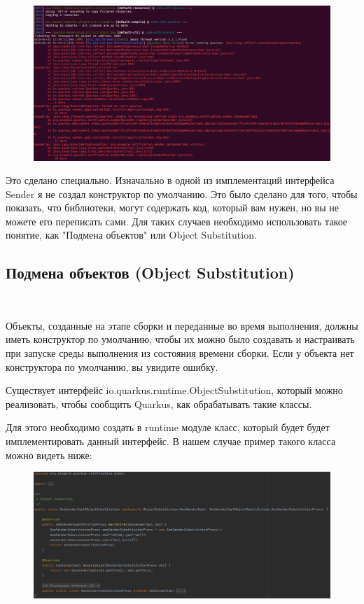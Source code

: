 \documentclass[russian,11pt]{article}
\begin{document}
\begin{figure}[H]
	\centering
	\includegraphics[width=\textwidth]{21}
\end{figure}

Это сделано специально. Изначально в одной из имплементаций интерфейса Sender я не создал конструктор по умолчанию. Это было сделано для того, чтобы показать, что библиотеки, могут содержать код, который вам нужен, но вы не можете его переписать сами. Для таких случаев необходимо использовать такое понятие, как "Подмена объектов" или Object Substitution.

\subsection{Подмена объектов (Object Substitution)}
~

Объекты, созданные на этапе сборки и переданные во время выполнения, должны иметь конструктор по умолчанию, чтобы их можно было создавать и настраивать при запуске среды выполнения из состояния времени сборки. Если у объекта нет конструктора по умолчанию, вы увидите ошибку.

Существует интерфейс io.quarkus.runtime.ObjectSubstitution, который можно реализовать, чтобы сообщить Quarkus, как обрабатывать такие классы. 

\newpage
Для этого необходимо создать в runtime модуле класс, который будет будет имплементировать данный интерфейс. В нашем случае пример такого класса можно видеть ниже:

\begin{figure}[H]
	\centering
	\includegraphics[width=\textwidth]{22}
\end{figure}
\end{document}
